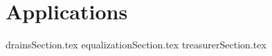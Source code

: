 
\chapter{Applications}
{drainsSection.tex}
\clearpage
{equalizationSection.tex}
\clearpage
{treasurerSection.tex}
\clearpage

